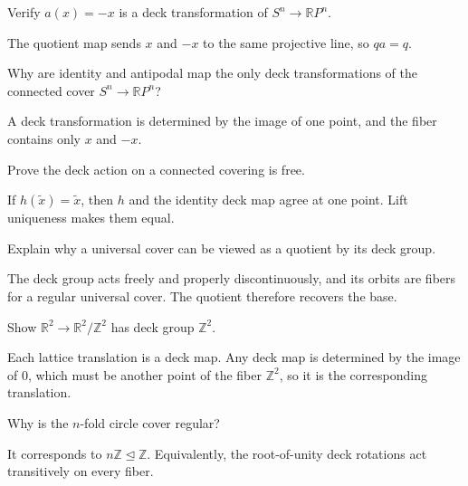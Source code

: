 \begin{problem}\label{prob:viii12-05}
Verify \(a(x)=-x\) is a deck transformation of \(S^n\to\mathbb RP^n\).
\end{problem}
\begin{solution}
The quotient map sends \(x\) and \(-x\) to the same projective line, so \(qa=q\).
\end{solution}

\begin{problem}\label{prob:viii12-06}
Why are identity and antipodal map the only deck transformations of the connected cover \(S^n\to\mathbb RP^n\)?
\end{problem}
\begin{solution}
A deck transformation is determined by the image of one point, and the fiber contains only \(x\) and \(-x\).
\end{solution}

\begin{problem}\label{prob:viii12-07}
Prove the deck action on a connected covering is free.
\end{problem}
\begin{solution}
If \(h(\tilde x)=\tilde x\), then \(h\) and the identity deck map agree at one point.  Lift uniqueness makes them equal.
\end{solution}

\begin{problem}\label{prob:viii12-08}
Explain why a universal cover can be viewed as a quotient by its deck group.
\end{problem}
\begin{solution}
The deck group acts freely and properly discontinuously, and its orbits are fibers for a regular universal cover.  The quotient therefore recovers the base.
\end{solution}

\begin{problem}\label{prob:viii12-09}
Show \(\mathbb R^2\to\mathbb R^2/\mathbb Z^2\) has deck group \(\mathbb Z^2\).
\end{problem}
\begin{solution}
Each lattice translation is a deck map.  Any deck map is determined by the image of \(0\), which must be another point of the fiber \(\mathbb Z^2\), so it is the corresponding translation.
\end{solution}

\begin{problem}[Regularity of \(z^n\)]\label{prob:viii12-10}
Why is the \(n\)-fold circle cover regular?
\end{problem}
\begin{solution}
It corresponds to \(n\mathbb Z\trianglelefteq\mathbb Z\). Equivalently, the root-of-unity deck rotations act transitively on every fiber.
\end{solution}

